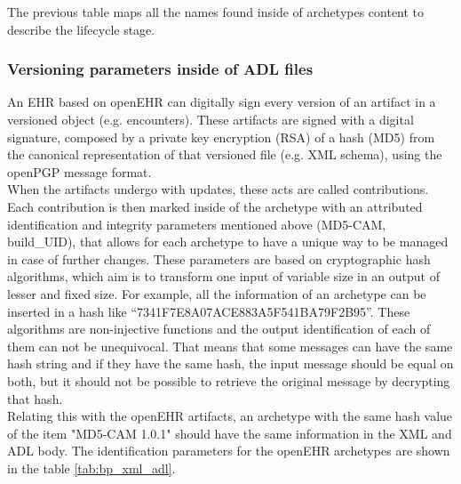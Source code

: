 \documentclass[mim_thesis.tex]{subfiles}
\begin{document}
The previous table maps all the names found inside of archetypes content to describe the lifecycle stage. 

\subsubsection{Versioning parameters inside of ADL files}

An EHR based on openEHR can digitally sign every version of an artifact in a versioned object (e.g. encounters). These artifacts are signed with a digital signature, composed by a private key encryption (RSA) of a hash (MD5) from the canonical representation of that versioned file (e.g. XML schema), using the openPGP message format. \\

When the artifacts undergo with updates, these acts are called contributions. Each contribution is then marked inside of the archetype with an attributed identification and integrity parameters mentioned above (MD5-CAM, build\_UID), that allows for each archetype to have a unique way to be managed in case of further changes. These parameters are based on cryptographic hash algorithms, which aim is to transform one input of variable size in an output of lesser and fixed size. For example, all the information of an archetype can be inserted in a hash like “7341F7E8A07ACE883A5F541BA79F2B95”. These algorithms are non-injective functions and the output identification of each of them can not be unequivocal. That means that some messages can have the same hash string and if they have the same hash, the input message should be equal on both, but it should not be possible to retrieve the original message by decrypting that hash. \\

Relating this with the openEHR artifacts, an archetype with the same hash value of the item "MD5-CAM 1.0.1" should have the same information in the XML and ADL body. The identification parameters for the openEHR archetypes are shown in the table \ref{tab:bp_xml_adl}.
\end{document}
